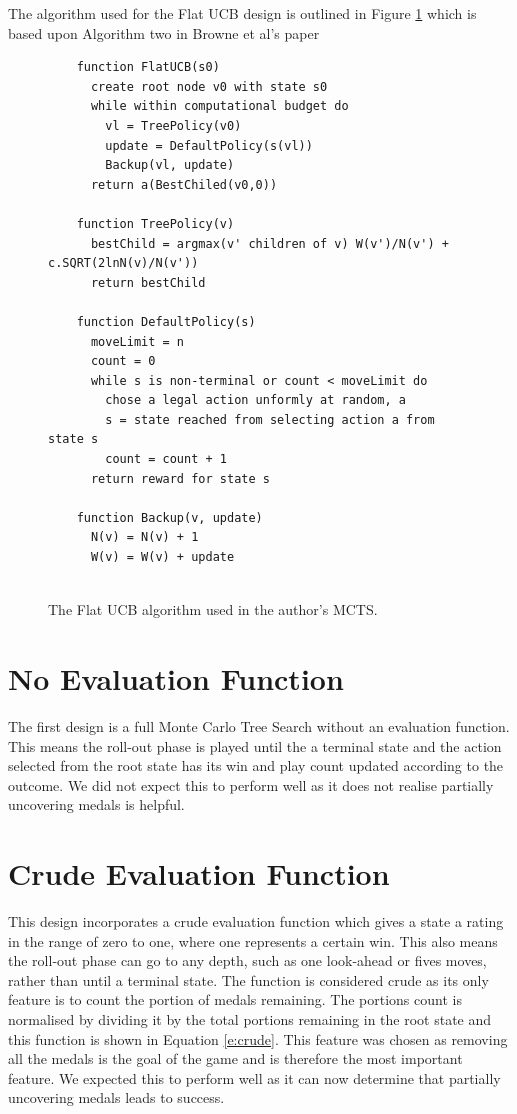 \documentclass{bhamthesis}
\theoremstyle{definition}
\begin{document}
The algorithm used for the Flat UCB design is outlined in Figure \ref{l:FlatUCB} which is based upon Algorithm two in Browne et al's paper \cite{Browne2012}


\begin{figure}[h]
	\centering
	\begin{verbatim}
	function FlatUCB(s0)
	  create root node v0 with state s0
	  while within computational budget do
	    vl = TreePolicy(v0)
	    update = DefaultPolicy(s(vl))
	    Backup(vl, update)
	  return a(BestChiled(v0,0))
	
	function TreePolicy(v)
	  bestChild = argmax(v' children of v) W(v')/N(v') + c.SQRT(2lnN(v)/N(v'))
	  return bestChild
	  
	function DefaultPolicy(s)
	  moveLimit = n
	  count = 0
	  while s is non-terminal or count < moveLimit do
	    chose a legal action unformly at random, a
	    s = state reached from selecting action a from state s
	    count = count + 1
	  return reward for state s
	
	function Backup(v, update)
	  N(v) = N(v) + 1
	  W(v) = W(v) + update
	
	\end{verbatim}\label{l:FlatUCB}
	\caption{The Flat UCB algorithm used in the author's MCTS.}
\end{figure}




\section{No Evaluation Function}\label{s:noEval}
The first design is a full Monte Carlo Tree Search without an evaluation function. This means the roll-out phase is played until the a terminal state and the action selected from the root state has its win and play count updated according to the outcome. We did not expect this to perform well as it does not realise partially uncovering medals is helpful.

\section{Crude Evaluation Function}\label{s:crudeF}
This design incorporates a crude evaluation function which gives a state a rating in the range of zero to one, where one represents a certain win. This also means the roll-out phase can go to any depth, such as one look-ahead or fives moves, rather than until a terminal state. The function is considered crude as its only feature is to count the portion of medals remaining. The portions count is normalised by dividing it by the total portions remaining in the root state and this function is shown in Equation \ref{e:crude}. This feature was chosen as removing all the medals is the goal of the game and is therefore the most important feature. We expected this to perform well as it can now determine that partially uncovering medals leads to success.
\end{document}
